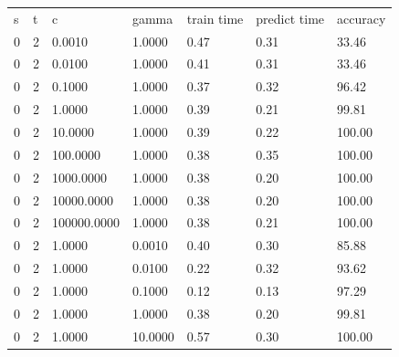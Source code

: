 \documentclass[12pt,oneside]{book}
\begin{document}
\begin{table}
\begin{tabular}{|l|l|l||l|l|l|l|}
\hline

s               & t               & c               & gamma           & train time      & predict time    & accuracy        \\
0               & 2               & 0.0010          & 1.0000          & 0.47            & 0.31            & 33.46           \\
0               & 2               & 0.0100          & 1.0000          & 0.41            & 0.31            & 33.46           \\
0               & 2               & 0.1000          & 1.0000          & 0.37            & 0.32            & 96.42           \\
0               & 2               & 1.0000          & 1.0000          & 0.39            & 0.21            & 99.81           \\
0               & 2               & 10.0000         & 1.0000          & 0.39            & 0.22            & 100.00          \\
0               & 2               & 100.0000        & 1.0000          & 0.38            & 0.35            & 100.00          \\
0               & 2               & 1000.0000       & 1.0000          & 0.38            & 0.20            & 100.00          \\
0               & 2               & 10000.0000      & 1.0000          & 0.38            & 0.20            & 100.00          \\
0               & 2               & 100000.0000     & 1.0000          & 0.38            & 0.21            & 100.00          \\
0               & 2               & 1.0000          & 0.0010          & 0.40            & 0.30            & 85.88           \\
0               & 2               & 1.0000          & 0.0100          & 0.22            & 0.32            & 93.62           \\
0               & 2               & 1.0000          & 0.1000          & 0.12            & 0.13            & 97.29           \\
0               & 2               & 1.0000          & 1.0000          & 0.38            & 0.20            & 99.81           \\
0               & 2               & 1.0000          & 10.0000         & 0.57            & 0.30            & 100.00          \\

\end{tabular}
\end{table}
\end{document}
